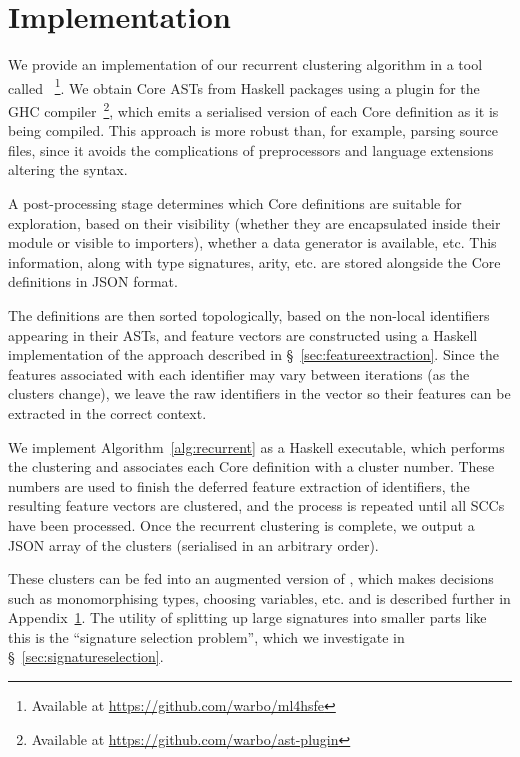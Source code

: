 \section{Implementation}
\label{sec:implementation}

We provide an implementation of our recurrent clustering algorithm in a tool
called \mlforhs{}~\footnote{Available at
  \url{https://github.com/warbo/ml4hsfe}}. We obtain Core ASTs from Haskell
packages using a plugin for the GHC compiler~\footnote{Available at
  \url{https://github.com/warbo/ast-plugin}}, which emits a serialised version
of each Core definition as it is being compiled. This approach is more robust
than, for example, parsing source files, since it avoids the complications of
preprocessors and language extensions altering the syntax.

A post-processing stage determines which Core definitions are suitable for
exploration, based on their visibility (whether they are encapsulated inside
their module or visible to importers), whether a data generator is available,
etc. This information, along with type signatures, arity, etc. are stored
alongside the Core definitions in JSON format.

The definitions are then sorted topologically, based on the non-local
identifiers appearing in their ASTs, and feature vectors are constructed using a
Haskell implementation of the approach described in
\S~\ref{sec:featureextraction}. Since the features associated with each
identifier may vary between iterations (as the clusters change), we leave the
raw identifiers in the vector so their features can be extracted in the correct
context.

We implement Algorithm~\ref{alg:recurrent} as a Haskell executable, which
performs the clustering and associates each Core definition with a cluster
number. These numbers are used to finish the deferred feature extraction of
identifiers, the resulting feature vectors are clustered, and the process is
repeated until all SCCs have been processed. Once the recurrent clustering is
complete, we output a JSON array of the clusters (serialised in an arbitrary
order).

These clusters can be fed into an augmented version of \quickspec{}, which makes
decisions such as monomorphising types, choosing variables, etc. and is
described further in Appendix~\ref{sec:implementation}. The utility of splitting
up large signatures into smaller parts like this is the ``signature selection
problem'', which we investigate in \S~\ref{sec:signatureselection}.

